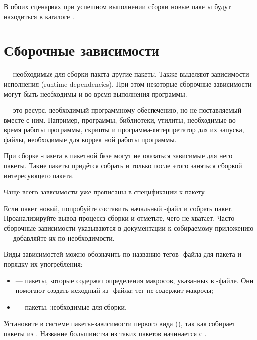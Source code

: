 В обоих сценариях при успешном выполнении сборки новые пакеты будут находиться в каталоге . 


\section{Сборочные зависимости}
 --- необходимые для сборки пакета другие пакеты. Также выделяют зависимости исполнения (runtime dependencies). При этом некоторые сборочные зависимости могут быть необходимы и во время выполнения программы. 

 --- это ресурс, необходимый программному обеспечению, но не поставляемый вместе с ним. Например, программы, библиотеки, утилиты, необходимые во время работы программы, скрипты и программа-интерпретатор для их запуска, файлы, необходимые для корректной работы программы. 

При сборке -пакета в пакетной базе  могут не оказаться зависимые для него пакеты. Такие пакеты придётся собрать и только после этого заняться сборкой интересующего пакета. 


Чаще всего зависимости уже прописаны в спецификации к пакету.

Если пакет новый, попробуйте составить начальный -файл и собрать пакет. Проанализируйте вывод процесса сборки и отметьте, чего не хватает. Часто сборочные зависимости указываются в документации к собираемому приложению --- добавляйте их по необходимости.

Виды зависимостей можно обозначить по названию тегов -файла для пакета и порядку их употребления: 
\begin{itemize}
	\item {} --- пакеты, которые содержат определения макросов, указанных в -файле. Они помогают создать исходный  из -файла; тег не содержит макросы;

	\item {} --- пакеты, необходимые для сборки.
\end{itemize}

Установите в системе пакеты-зависимости первого вида (), так как  собирает пакеты из . Название большинства из таких пакетов начинается с .

